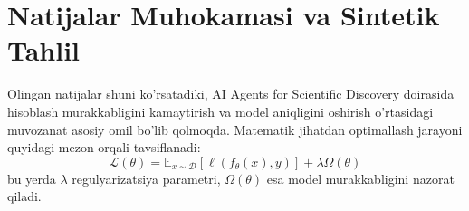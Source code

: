 \section{Natijalar Muhokamasi va Sintetik Tahlil}
Olingan natijalar shuni ko'rsatadiki, AI Agents for Scientific Discovery doirasida hisoblash murakkabligini kamaytirish va model aniqligini oshirish o'rtasidagi muvozanat asosiy omil bo'lib qolmoqda. Matematik jihatdan optimallash jarayoni quyidagi mezon orqali tavsiflanadi:
\begin{equation}
  \mathcal{L}(\theta) = \mathbb{E}_{x \sim \mathcal{D}} [\ell(f_\theta(x), y)] + \lambda \Omega(\theta)
\end{equation}
bu yerda $\lambda$ regulyarizatsiya parametri, $\Omega(\theta)$ esa model murakkabligini nazorat qiladi.
